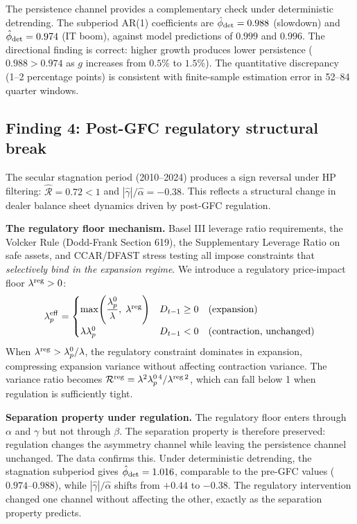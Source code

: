\documentclass[12pt,a4paper]{article}
\theoremstyle{definition}
\begin{document}
The persistence channel provides a complementary check under
deterministic detrending. The subperiod AR(1) coefficients are
$\hat{\phi}_{\rm det} = 0.988$ (slowdown) and $\hat{\phi}_{\rm det} =
0.974$ (IT boom), against model predictions of $0.999$ and $0.996$.
The directional finding is correct: higher growth produces lower
persistence ($0.988 > 0.974$ as $g$ increases from $0.5\%$ to $1.5\%$).
The quantitative discrepancy (1--2 percentage points) is consistent
with finite-sample estimation error in 52--84 quarter windows.

\subsection{Finding 4: Post-GFC regulatory structural break}
\label{sec:finding4}

The secular stagnation period (2010--2024) produces a sign reversal
under HP filtering: $\hat{\mathcal{R}} = 0.72 < 1$ and
$|\hat{\gamma}|/\hat{\alpha} = -0.38$. This reflects a structural
change in dealer balance sheet dynamics driven by post-GFC regulation.

\noindent\textbf{The regulatory floor mechanism.} Basel III leverage
ratio requirements, the Volcker Rule (Dodd-Frank Section 619), the
Supplementary Leverage Ratio on safe assets, and CCAR/DFAST stress
testing all impose constraints that \emph{selectively bind in the
expansion regime}. We introduce a regulatory price-impact floor
$\lambda^{\rm reg} > 0$:
\begin{equation}
  \lambda^{\rm eff}_p =
  \begin{cases}
    \max\!\left(\dfrac{\lambda^0_p}{\lambda},\; \lambda^{\rm reg}\right)
      & D_{t-1} \geq 0 \quad\text{(expansion)} \\[8pt]
    \lambda\lambda^0_p
      & D_{t-1} < 0 \quad\text{(contraction, unchanged)}
  \end{cases}
  \label{eq:reg_floor}
\end{equation}
When $\lambda^{\rm reg} > \lambda^0_p/\lambda$, the regulatory
constraint dominates in expansion, compressing expansion variance
without affecting contraction variance. The variance ratio becomes
$\mathcal{R}^{\rm reg} = \lambda^2\lambda^{0\,4}_p /
\lambda^{\rm reg\,2}$, which can fall below 1 when regulation is
sufficiently tight.

\noindent\textbf{Separation property under regulation.} The regulatory
floor enters through $\alpha$ and $\gamma$ but not through $\beta$.
The separation property is therefore preserved: regulation changes the
asymmetry channel while leaving the persistence channel unchanged.
The data confirms this. Under deterministic detrending, the stagnation
subperiod gives $\hat{\phi}_{\rm det} = 1.016$, comparable to the
pre-GFC values ($0.974$--$0.988$), while $|\hat{\gamma}|/\hat{\alpha}$
shifts from $+0.44$ to $-0.38$. The regulatory intervention changed
one channel without affecting the other, exactly as the separation
property predicts.
\end{document}
